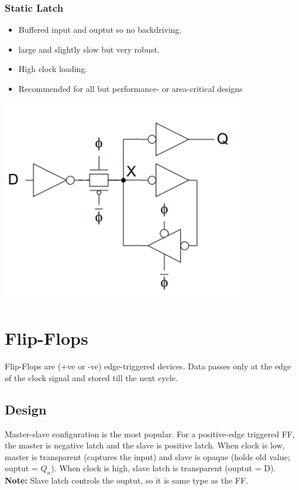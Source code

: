 \documentclass[11pt]{article}
\begin{document}
\subsubsection*{Static Latch}
    \begin{minipage}{0.5\linewidth}
        \begin{itemize}
            \item Buffered input and ouptut so no backdriving.
            \item large and slightly slow but very robust.
            \item High clock loading.
            \item Recommended for all but performance- or area-critical designs
        \end{itemize}
    \end{minipage}
    \hfill
    \begin{minipage}{0.4\linewidth}    
        \begin{center}
            \includegraphics[width=0.8\textwidth]{latch3.png}
        \end{center}
    \end{minipage}

\section*{Flip-Flops}
Flip-Flops are (+ve or -ve) edge-triggered devices. Data passes only at the edge of the clock signal and stored till the next cycle.

\subsection*{Design}
Master-slave configuration is the most popular. For a positive-edge triggered FF, the master is negative latch and the slave is positive latch. When clock is low, master is transparent (captures the input) and slave is opaque (holds old value; ouptut = $Q_n$). When clock is high, slave latch is transparent (ouptut = D).\\
\textbf{Note:} Slave latch controls the ouptut, so it is same type as the FF.
\end{document}
